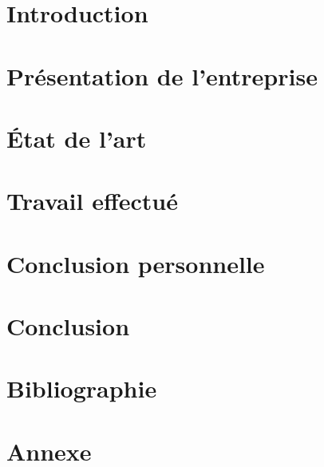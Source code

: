 \documentclass{rapport de stage}
\begin{document}

\section{Introduction}

\newpage


\section{Présentation de l'entreprise}

\newpage


\section{État de l'art}

\newpage


\section{Travail effectué}

\newpage


\section{Conclusion personnelle}

\newpage


\section{Conclusion} 

\newpage


\section{Bibliographie}

\newpage


\section{Annexe}

\newpage
\end{document}
